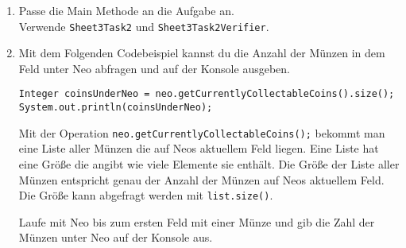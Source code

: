 
\begin{enumerate}
	\item
		Passe die Main Methode an die Aufgabe an.\\
		Verwende \lstinline{Sheet3Task2} und \lstinline{Sheet3Task2Verifier}.

	\item 
		Mit dem Folgenden Codebeispiel kannst du die Anzahl der Münzen in dem Feld unter Neo abfragen und auf der Konsole ausgeben.

		\begin{lstlisting}
Integer coinsUnderNeo = neo.getCurrentlyCollectableCoins().size();
System.out.println(coinsUnderNeo);
		\end{lstlisting}

		Mit der Operation \lstinline{neo.getCurrentlyCollectableCoins();} bekommt man eine Liste aller Münzen die auf Neos aktuellem Feld liegen. 
		Eine Liste hat eine Größe die angibt wie viele Elemente sie enthält. 
		Die Größe der Liste aller Münzen entspricht genau der Anzahl der Münzen auf Neos aktuellem Feld. 
		Die Größe kann abgefragt werden mit \lstinline{list.size()}. 

		Laufe mit Neo bis zum ersten Feld mit einer Münze und gib die Zahl der Münzen unter Neo auf der Konsole aus.
\end{enumerate}


